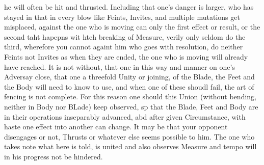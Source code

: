 \newpage


\newpage


he will often be hit and thrusted. Including that one's danger is
larger, who has stayed in that in every blow like Feints, Invites, and
multiple mutations get misplaced, against the one who is moving can
only the first effect or result, or the second taht hapepns wit hteh
breaking of Measure, verily only seldom do the third, wherefore you
cannot againt him who goes with resolution, do neither Feints not
Invites
as when they are ended, the one who is moving will already have
reached. It is not without, that one in this way and manner on one's
Adversay close, that one a threefold Unity or joining, of the Blade,
the Feet and the Body will need to know to use, and when one of these
shoudl fail, the art of fencing is not complete. For this reason one
should this Union (without bending, neither in Body nor BLade) keep
observed, sp that the Blade, Feet and Body are in their operations
inseparably advanced, abd after given Circumstance, with haste one
effect into another can change. It may be that your opponent
disengages or not, Thrusts or whatever else seems possible to him. The
one who takes note what here is told, is united and also observes
Measure and tempo will in his progress not be hindered.

